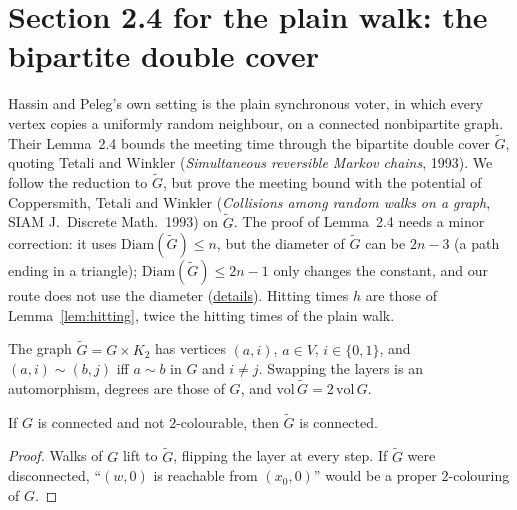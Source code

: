 \section{Section 2.4 for the plain walk: the bipartite double cover}\label{sec:hp-plain-walk}
Hassin and Peleg's own setting is the plain synchronous voter, in which every vertex copies a
uniformly random neighbour, on a connected nonbipartite graph. Their Lemma~2.4 bounds the
meeting time through the bipartite double cover $\tilde G$, quoting Tetali and Winkler
(\emph{Simultaneous reversible Markov chains}, 1993). We follow the reduction to $\tilde G$, but
prove the meeting bound with the potential of Coppersmith, Tetali and Winkler
(\emph{Collisions among random walks on a graph}, SIAM J.\ Discrete Math.\ 1993) on $\tilde G$.
The proof of Lemma~2.4 needs a minor correction: it uses $\mathrm{Diam}(\tilde G)\le n$, but the
diameter of $\tilde G$ can be $2n-3$ (a path ending in a triangle); $\mathrm{Diam}(\tilde G)\le
2n-1$ only changes the constant, and our route does not use the diameter
(\href{https://github.com/formal-dynamics/leanamics/blob/main/voter/FORMALIZATION_DIFFERENCES.md#43-the-plain-walk-on-connected-nonbipartite-graphs-lemma-24-and-theorem-25}{details}).
Hitting times $h$ are those of Lemma~\ref{lem:hitting}, twice the hitting times of the plain walk.
\begin{definition}\label{def:double-cover}
\leanok{}
The graph $\tilde G=G\times K_2$ has vertices $(a,i)$, $a\in V$, $i\in\{0,1\}$, and
$(a,i)\sim(b,j)$ iff $a\sim b$ in $G$ and $i\neq j$. Swapping the layers is an automorphism,
degrees are those of $G$, and $\mathrm{vol}\,\tilde G=2\,\mathrm{vol}\,G$.
\end{definition}
\begin{lemma}\label{lem:double-cover-connected}
\leanok{}
If $G$ is connected and not $2$-colourable, then $\tilde G$ is connected.
\end{lemma}
\begin{proof}\leanok
Walks of $G$ lift to $\tilde G$, flipping the layer at every step. If $\tilde G$ were
disconnected, ``$(w,0)$ is reachable from $(x_0,0)$'' would be a proper $2$-colouring of $G$.
\end{proof}
